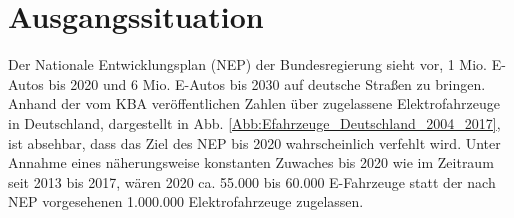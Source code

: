 %



\section{Ausgangssituation}

	Der Nationale Entwicklungsplan (NEP) der Bundesregierung sieht vor, 1 Mio. E-Autos bis 2020 und 6 Mio. E-Autos bis 2030 auf deutsche Straßen zu bringen. Anhand der vom \ac{KBA} veröffentlichen Zahlen über zugelassene Elektrofahrzeuge in Deutschland, dargestellt in Abb. \ref{Abb:Efahrzeuge_Deutschland_2004_2017}, ist absehbar, dass das Ziel des NEP bis 2020 wahrscheinlich verfehlt wird. Unter Annahme eines näherungsweise konstanten Zuwaches bis 2020 wie im Zeitraum seit 2013 bis 2017, wären 2020 ca. 55.000 bis 60.000 E-Fahrzeuge statt der nach NEP vorgesehenen 1.000.000 Elektrofahrzeuge zugelassen. \cite{NEP_2009}\\
	
